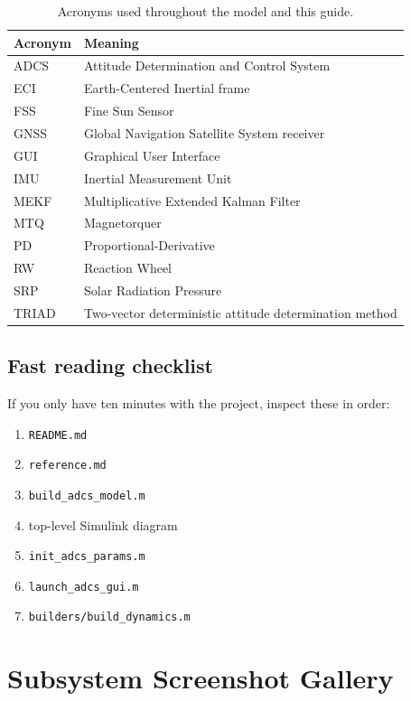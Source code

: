 \documentclass[11pt]{article}
\begin{document}
\begin{table}[H]
\centering
\begin{tabularx}{\textwidth}{@{}lY@{}}
\toprule
\textbf{Acronym} & \textbf{Meaning} \\
\midrule
ADCS & Attitude Determination and Control System \\
ECI & Earth-Centered Inertial frame \\
FSS & Fine Sun Sensor \\
GNSS & Global Navigation Satellite System receiver \\
GUI & Graphical User Interface \\
IMU & Inertial Measurement Unit \\
MEKF & Multiplicative Extended Kalman Filter \\
MTQ & Magnetorquer \\
PD & Proportional-Derivative \\
RW & Reaction Wheel \\
SRP & Solar Radiation Pressure \\
TRIAD & Two-vector deterministic attitude determination method \\
\bottomrule
\end{tabularx}
\caption{Acronyms used throughout the model and this guide.}
\end{table}

\subsection{Fast reading checklist}

If you only have ten minutes with the project, inspect these in order:

\begin{enumerate}
\item \texttt{README.md}
\item \texttt{reference.md}
\item \texttt{build\_adcs\_model.m}
\item top-level Simulink diagram
\item \texttt{init\_adcs\_params.m}
\item \texttt{launch\_adcs\_gui.m}
\item \texttt{builders/build\_dynamics.m}
\end{enumerate}

\appendix

\section{Subsystem Screenshot Gallery}
\end{document}
